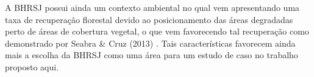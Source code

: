 A BHRSJ possui ainda um contexto ambiental no qual vem apresentando uma taxa de recuperação florestal devido ao posicionamento das áreas degradadas perto de áreas de cobertura vegetal, o que vem favorecendo tal recuperação como demonstrado por Seabra \& Cruz (2013) \cite{SEABRA_CRUZ}. Tais características favorecem ainda mais a escolha da BHRSJ como uma área para um estudo de caso no trabalho proposto aqui. \\
